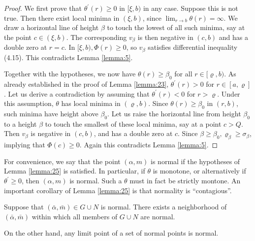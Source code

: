 \begin{proof}
  We first prove that $\theta^{\prime}(r) \geq 0$ in $[\xi, b)$ in any case.
  Suppose this is not true. Then there exist local minima in $(\xi, b)$,
  since $\lim _{r \rightarrow b} \theta(r)=\infty$.
  We draw a horizontal line of height $\beta$ to touch the lowest of all such minima,
  say at the point $c \in(\xi, b)$.
  The corresponding $v_\beta$ is then negative in $(c, b)$ and has a double zero at $r=c$.
  In $[\xi, b), \Phi(r) \geq 0$, so $v_\beta$ satisfies differential inequality (4.15).
  This contradicts Lemma \ref{lemma:5}.
  
  Together with the hypotheses, we now have $\theta(r) \geq \beta_0$
  for all $r \in[\varrho, b)$.
  As already established in the proof of Lemma \ref{lemma:23},
  $\theta^{\prime}(r)>0$ for $r \in[a, \varrho]$.
  Let us derive a contradiction by assuming that $\theta^{\prime}(r)<0$ for $r>\varrho$.
  Under this assumption, $\theta$ has local minima in $(\varrho, b)$.
  Since $\theta(r) \geq \beta_0$ in $(r, b)$, such minima have height above $\beta_0$.
  Let us raise the horizontal line from height $\beta_0$ to a height $\beta$
  to touch the smallest of these local minima, say at a point $c>Q$.
  Then $v_\beta$ is negative in $(c, b)$, and has a double zero at $c$.
  Since $\beta \geq \beta_0, \varrho_\beta \geq \sigma_\beta$,
  implying that $\Phi(c) \geq 0$. Again this contradicts Lemma \ref{lemma:5}.
\end{proof}

For convenience, we say that the point $(\alpha, m)$ is normal
if the hypotheses of Lemma \ref{lemma:25} is satisfied. In particular, if $\theta$ is monotone,
or alternatively if $\theta^{\prime} \geq 0$, then $(\alpha, m)$ is normal.
Such a $\theta$ must in fact be strictly montone. An important corollary of Lemma \ref{lemma:25}
is that normality is ``contagious''.

\begin{lemma}\label{lemma:26}
  Suppose that $(\bar{\alpha}, \bar{m}) \in G \cup N$ is normal.
  There exists a neighborhood of $(\bar{\alpha}, \bar{m})$ within which all members of $G \cup N$ are normal.
\end{lemma}

On the other hand, any limit point of a set of normal points is normal.


